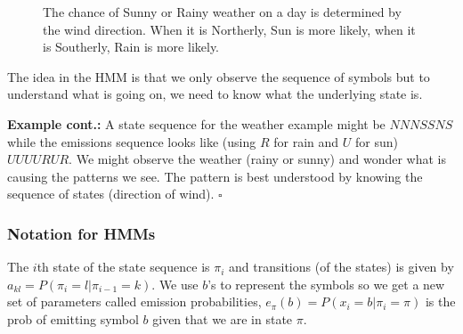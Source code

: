 \documentclass[11pt]{article}
\newcommand{\sqend}{\hfill $\square$}
\begin{document}
\begin{figure}[htbp]
\begin{center}
\end{center}
\caption{The chance of Sunny or Rainy weather on a day is determined by the wind direction.  When it is Northerly, Sun is more likely, when it is Southerly, Rain is more likely. }
\end{figure}






The idea in the HMM is that we only observe the sequence of symbols but to understand what is going on, we need to know what the underlying state is.


{\bf Example cont.:} A state sequence for the weather example might be $NNNSSNS$ while the emissions sequence looks like (using $R$ for rain and $U$ for sun)  $UUUURUR$. We might observe the weather (rainy or sunny) and wonder what is causing the patterns we see.  The pattern is best understood by knowing the sequence of states (direction of wind). \sqend

\subsubsection*{Notation for HMMs}

The $i$th state of the state sequence is $\pi_i$ and transitions (of the states) is given by $a_{kl} = P(\pi_i  = l | \pi_{i-1} = k)$.  We use $b$'s to represent the symbols so we get a new set of parameters called  emission probabilities, $e_{\pi}(b) = P(x_i = b | \pi_i = \pi)$ is the prob of emitting symbol $b$ given that we are in state $\pi$.
\end{document}
